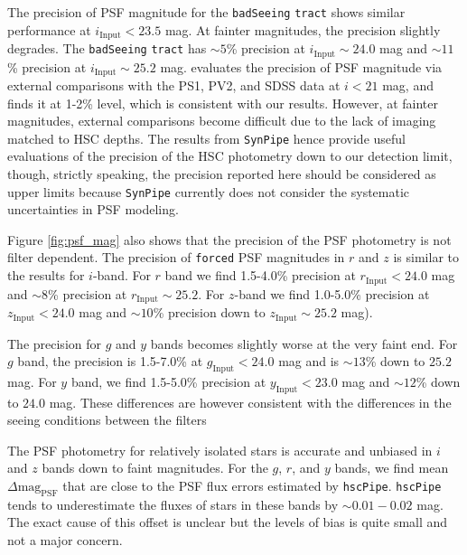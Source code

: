 \documentclass[useamsfonts]{pasj01}
\def\hscpipe{\texttt{hscPipe}}
\def\synpipe{\texttt{SynPipe}}
\def\forced{\texttt{forced}}
\def\tract{\texttt{tract}}
\begin{document}
    The precision of PSF magnitude for the \texttt{badSeeing} \tract{} shows similar 
    performance at $i_{\mathrm{Input}}<23.5$ mag. 
    At fainter magnitudes, the precision slightly degrades. 
    The \texttt{badSeeing} \tract{} has ${\sim}5$\% precision at
    $i_{\mathrm{Input}}{\sim}24.0$ mag and ${\sim}11$\% precision at
    $i_{\mathrm{Input}}{\sim}25.2$ mag.
    \citet{HSCDR1} evaluates the precision of PSF magnitude via external comparisons
    with the PS1, PV2, and SDSS data at $i<21$ mag, and finds it at 1-2\% level,
    which is consistent with our results. 
    However, at fainter magnitudes, external comparisons become difficult due to the 
    lack of imaging matched to HSC depths.
    The results from \synpipe{} hence provide useful evaluations of the precision of 
    the HSC photometry down to our detection limit, though, strictly speaking, the 
    precision reported here should be considered as upper limits because 
    \synpipe{} currently does not consider the systematic uncertainties in PSF 
    modeling.

    Figure \ref{fig:psf_mag} also shows that the precision of the PSF photometry is 
    not filter dependent. 
    The precision of \forced{} PSF magnitudes in $r$ and $z$ is similar to the results
    for $i$-band. 
    For $r$ band we find 1.5-4.0\% precision at $r_{\mathrm{Input}} < 24.0$ mag and 
    ${\sim}8$\% precision at $r_{\mathrm{Input}}{\sim}25.2$. 
    For $z$-band we find 1.0-5.0\% precision at $z_{\mathrm{Input}} < 24.0$ mag and 
    ${\sim}10$\% precision down to $z_{\mathrm{Input}}{\sim}25.2$ mag).
    
    The precision for $g$ and $y$ bands becomes slightly worse at the very faint end. 
    For $g$ band, the precision is 1.5-7.0\% at $g_{\mathrm{Input}} < 24.0$ mag and is
    ${\sim}13$\% down to $25.2$ mag.
    For $y$ band, we find 1.5-5.0\% precision at $y_{\mathrm{Input}} < 23.0$ mag and
    ${\sim}12$\% down to $24.0$ mag. 
    These differences are however consistent with the differences in the seeing 
    conditions between the filters 
    

    The PSF photometry for relatively isolated stars is accurate and unbiased in $i$ 
    and $z$ bands down to faint magnitudes. 
    For the $g$, $r$, and $y$ bands, we find mean $\Delta \mathrm{mag}_{\mathrm{PSF}}$
    that are close to the PSF flux errors estimated by \hscpipe{}.  
    \hscpipe{} tends to underestimate the fluxes of stars in these bands by 
    ${\sim}0.01-0.02$ mag. 
    The exact cause of this offset is unclear but the levels of bias is quite small 
    and not a major concern.  
\end{document}
